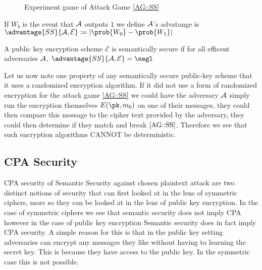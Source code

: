 \begin{figure}[htbp]
    \centering
\caption{Experiment game of Attack Game \ref{AG::SS}} 
\end{figure}

If \(W_b\) is the event that \(\mathcal{A}\) outputs \(1\) we define \(\mathcal{A}\)'s advatange is \(\advantage{SS}{\adv, \mathcal{E} } \coloneqq  |\prob{W_0} - \prob{W_1}|\) 

\begin{definition}
    A public key encryption scheme \(\mathcal{E}\) is semantically secure if for all efficent adversaries \(\mathcal{A}\), \( \advantage{SS}{\adv, \mathcal{E}} = \negl\)   
\end{definition}

Let us now note one property of any semantically secure public-key scheme that it uses a randomized encryption algorithm.  If it did not use a form of randomized encryption for the attack game \ref{AG::SS} we could have the adversary \(\mathcal{A}\) simply run the encryption themselves \(E(\pk, m_0)\) on one of their messages, they could then compare this message to the cipher text provided by the adversary, they could then determine if they match and break \(\ref{AG::SS}\). Therefore we see that such encryption algorithms CANNOT be deterministic.  

\subsection{CPA Security}

CPA security of Semantic Security against chosen plaintext attack are two distinct notions of security that can first looked at in the lens of symmetric ciphers, more so they can be looked at in the lens of public key encryption. In the case of symmetric ciphers we see that semantic security does not imply CPA however in the case of public key encryption Semantic security does in fact imply CPA security.  A simple reason for this is that in the public key setting adversaries can encrypt any messages they like without having to learning the secret key. This is because they have access to the public key. In the symmetric case this is not possible. 

